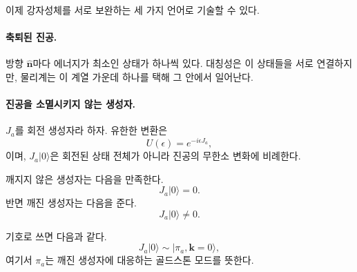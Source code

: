 이제 강자성체를 서로 보완하는 세 가지 언어로 기술할 수 있다.

\paragraph{축퇴된 진공.}
방향 \(\hat{\mathbf n}\)마다 에너지가 최소인 상태가 하나씩 있다. 대칭성은 이 상태들을 서로 연결하지만, 물리계는 이 계열 가운데 하나를 택해 그 안에서 일어난다.

\paragraph{진공을 소멸시키지 않는 생성자.}
\(J_a\)를 회전 생성자라 하자. 유한한 변환은
\begin{equation}
U(\epsilon)=e^{-i\epsilon J_a},
\end{equation}
이며, \(J_a|0\rangle\)은 회전된 상태 전체가 아니라 진공의 무한소 변화에 비례한다.

\begin{classroomqa}
\end{classroomqa}

깨지지 않은 생성자는 다음을 만족한다.
\begin{equation}
J_a|0\rangle=0.
\label{eq:l9-unbroken-generator}
\end{equation}
반면 깨진 생성자는 다음을 준다.
\begin{equation}
J_a|0\rangle\neq0.
\label{eq:l9-broken-generator}
\end{equation}

\begin{classroomqa}
\end{classroomqa}

\begin{classroomqa}
\end{classroomqa}

기호로 쓰면 다음과 같다.
\begin{equation}
J_a|0\rangle
\sim
|\pi_a,\mathbf k=0\rangle,
\label{eq:l9-generator-goldstone}
\end{equation}
여기서 \(\pi_a\)는 깨진 생성자에 대응하는 골드스톤 모드를 뜻한다.

